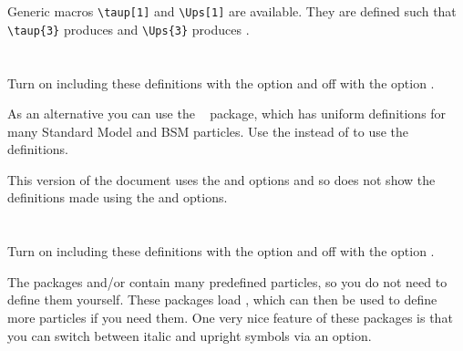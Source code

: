 \documentclass[REPORT=false, mhchem, USenglish]{atlasdoc}
\begin{document}


Generic macros \verb|\taup[1]| and \verb|\Ups[1]| are available.
They are defined such that
\verb|\taup{3}| produces  and
\verb|\Ups{3}| produces .




\newpage
\section{}

Turn on including these definitions with the option  and off with the option .

As an alternative you can use the ~\cite{hepparticles} package,
which has uniform definitions for many Standard Model and BSM particles.
Use the  instead of  to use the  definitions.

This version of the document uses the  and  options and so
does not show the definitions made using the  and  options.
%


\newpage
\section{}

Turn on including these definitions with the option  and off with the option .

The packages  and/or  contain many predefined particles,
so you do not need to define them yourself.
These packages load , which can then be used to define more particles if you need them.
One very nice feature of these packages is that you can switch between italic and upright symbols via an option.









\printbibliography
\end{document}
